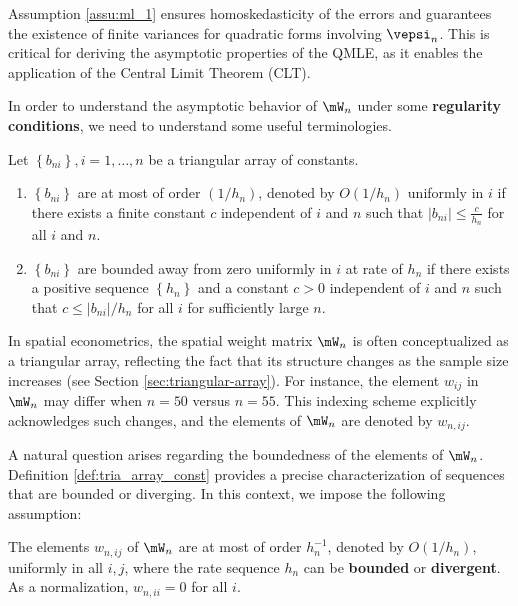 \documentclass[english,12pt]{book}\usepackage[]{graphicx}\usepackage[]{xcolor}
\begin{document}
Assumption \ref{assu:ml_1} ensures homoskedasticity of the errors and guarantees the existence of finite variances for quadratic forms involving \(\vepsi_n\). This is critical for deriving the asymptotic properties of the QMLE, as it enables the application of the Central Limit Theorem (CLT).

In order to understand the asymptotic behavior of $\mW_n$ under some \textbf{regularity conditions}, we need to understand some useful terminologies.

\begin{definition}\label{def:tria_array_const}
Let $\left\lbrace b_{ni} \right\rbrace, i = 1, \ldots,n$ be a triangular array of constants.

\begin{enumerate}
  \item $\left\lbrace b_{ni} \right\rbrace$ are at most of order $(1/h_n)$, denoted by $O(1/h_n)$ uniformly in $i$ if there exists a finite constant $c$ independent of $i$ and $n$ such that $\left|b_{ni}\right|\leq \frac{c}{h_n}$ for all $i$ and $n$.
  \item $\left\lbrace b_{ni} \right\rbrace$ are bounded away from zero uniformly in $i$ at rate of $h_n$ if there exists a positive sequence $\left\lbrace h_{n} \right\rbrace$ and a constant $c>0$ independent of $i$ and $n$ such that $c\leq \left|b_{ni}\right|/ h_n$ for all $i$ for sufficiently large $n$.
\end{enumerate}
\end{definition}

In spatial econometrics, the spatial weight matrix $\mW_n$ is often conceptualized as a triangular array, reflecting the fact that its structure changes as the sample size increases (see Section \ref{sec:triangular-array}). For instance, the element $w_{ij}$ in $\mW_n$ may differ when $n = 50$ versus $n = 55$. This indexing scheme explicitly acknowledges such changes, and the elements of $\mW_n$ are denoted by $w_{n,ij}$.

A natural question arises regarding the boundedness of the elements of $\mW_n$. Definition \ref{def:tria_array_const} provides a precise characterization of sequences that are bounded or diverging. In this context, we impose the following assumption:

\begin{assumption}\label{assu:ml_2}
	The elements $w_{n,ij}$ of $\mW_n$ are at most of order $h_n^{-1}$, denoted by $O(1/h_n)$, uniformly in all $i,j$, where the rate sequence ${h_n}$ can be \textbf{bounded} or \textbf{divergent}. As a normalization, $w_{n,ii} = 0$ for all $i$.
\end{assumption}
\end{document}
